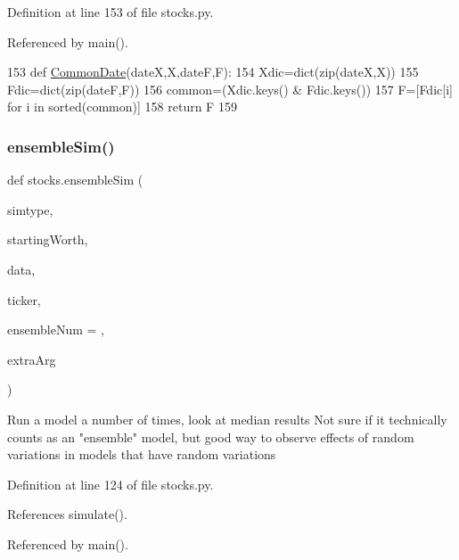 Definition at line 153 of file stocks.\+py.



Referenced by main().


\begin{DoxyCode}
153 \textcolor{keyword}{def }\hyperlink{namespacestocks_a5ce0ea6dd1cb1e1baf78fbb4313b64b9}{CommonDate}(dateX,X,dateF,F):
154     Xdic=dict(zip(dateX,X))
155     Fdic=dict(zip(dateF,F))
156     common=(Xdic.keys() & Fdic.keys())
157     F=[Fdic[i] \textcolor{keywordflow}{for} i \textcolor{keywordflow}{in} sorted(common)]
158     \textcolor{keywordflow}{return} F
159 
\end{DoxyCode}
\hypertarget{namespacestocks_a7d4f88b285b7a553f17f91e71ee18a31}{}\label{namespacestocks_a7d4f88b285b7a553f17f91e71ee18a31} 
\subsubsection{\texorpdfstring{ensemble\+Sim()}{ensembleSim()}}
{\footnotesize\ttfamily def stocks.\+ensemble\+Sim (\begin{DoxyParamCaption}\item[{}]{simtype,  }\item[{}]{starting\+Worth,  }\item[{}]{data,  }\item[{}]{ticker,  }\item[{}]{ensemble\+Num = {},  }\item[{}]{extra\+Arg }\end{DoxyParamCaption})}

\begin{DoxyVerb}Run a model a number of times, look at median results
Not sure if it technically counts as an "ensemble" model, but
good way to observe effects of random variations in models that
have random variations
\end{DoxyVerb}
 

Definition at line 124 of file stocks.\+py.



References simulate().



Referenced by main().


